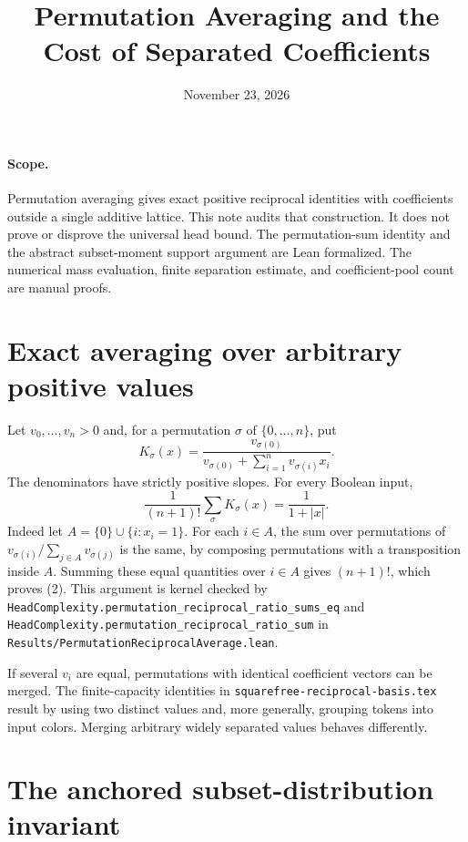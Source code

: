 \documentclass[11pt]{article}
\title{Permutation Averaging and the Cost of Separated Coefficients}
\author{}
\date{November 23, 2026}
\begin{document}
\maketitle

\paragraph{Scope.}
Permutation averaging gives exact positive reciprocal identities with
coefficients outside a single additive lattice. This note audits that
construction. It does not prove or disprove the universal head bound.
The permutation-sum identity and the abstract subset-moment support
argument are Lean formalized. The numerical mass evaluation, finite
separation estimate, and coefficient-pool count are manual proofs.

\section{Exact averaging over arbitrary positive values}

Let $v_0,\ldots,v_n>0$ and, for a permutation $\sigma$ of
$\{0,\ldots,n\}$, put
\[
 K_\sigma(x)=\frac{v_{\sigma(0)}}
                  {v_{\sigma(0)}+\sum_{i=1}^n v_{\sigma(i)}x_i}.
 \tag{1}
\]
The denominators have strictly positive slopes. For every Boolean input,
\[
        \frac1{(n+1)!}\sum_\sigma K_\sigma(x)
                            =\frac1{1+|x|}.
 \tag{2}
\]
Indeed let $A=\{0\}\cup\{i:x_i=1\}$. For each $i\in A$, the
sum over permutations of $v_{\sigma(i)}/\sum_{j\in A}v_{\sigma(j)}$
is the same, by composing permutations with a transposition inside $A$.
Summing these equal quantities over $i\in A$ gives $(n+1)!$,
which proves (2). This argument is kernel checked by
\texttt{HeadComplexity.permutation\_reciprocal\_ratio\_sums\_eq}
and \texttt{HeadComplexity.permutation\_reciprocal\_ratio\_sum}
in \texttt{Results/PermutationReciprocalAverage.lean}.

If several $v_i$ are equal, permutations with identical coefficient
vectors can be merged. The finite-capacity identities in
\texttt{squarefree-reciprocal-basis.tex} result by using two distinct
values and, more generally, grouping tokens into input colors.
Merging arbitrary widely separated values behaves differently.

\section{The anchored subset-distribution invariant}
\end{document}
